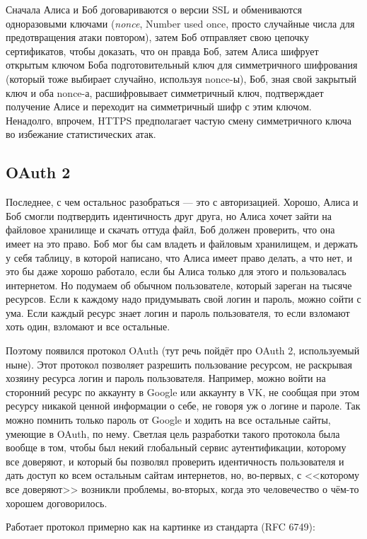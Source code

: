 \documentclass{../../text-style}
\begin{document}
Сначала Алиса и Боб договариваются о версии SSL и обмениваются одноразовыми ключами (\textit{nonce}, Number used once, просто случайные числа для предотвращения атаки повтором), затем Боб отправляет свою цепочку сертификатов, чтобы доказать, что он правда Боб, затем Алиса шифрует открытым ключом Боба подготовительный ключ для симметричного шифрования (который тоже выбирает случайно, используя nonce-ы), Боб, зная свой закрытый ключ и оба nonce-а, расшифровывает симметричный ключ, подтверждает получение Алисе и переходит на симметричный шифр с этим ключом. Ненадолго, впрочем, HTTPS предполагает частую смену симметричного ключа во избежание статистических атак.

\subsection{OAuth 2}

Последнее, с чем остальнос разобраться --- это с авторизацией. Хорошо, Алиса и Боб смогли подтвердить идентичность друг друга, но Алиса хочет зайти на файловое хранилище и скачать оттуда файл, Боб должен проверить, что она имеет на это право. Боб мог бы сам владеть и файловым хранилищем, и держать у себя таблицу, в которой написано, что Алиса имеет право делать, а что нет, и это бы даже хорошо работало, если бы Алиса только для этого и пользовалась интернетом. Но подумаем об обычном пользователе, который зареган на тысяче ресурсов. Если к каждому надо придумывать свой логин и пароль, можно сойти с ума. Если каждый ресурс знает логин и пароль пользователя, то если взломают хоть один, взломают и все остальные.

Поэтому появился протокол OAuth (тут речь пойдёт про OAuth 2, используемый ныне). Этот протокол позволяет разрешить пользование ресурсом, не раскрывая хозяину ресурса логин и пароль пользователя. Например, можно войти на сторонний ресурс по аккаунту в Google или аккаунту в VK, не сообщая при этом ресурсу никакой ценной информации о себе, не говоря уж о логине и пароле. Так можно помнить только пароль от Google и ходить на все остальные сайты, умеющие в OAuth, по нему. Светлая цель разработки такого протокола была вообще в том, чтобы был некий глобальный сервис аутентификации, которому все доверяют, и который бы позволял проверить идентичность пользователя и дать доступ ко всем остальным сайтам интернетов, но, во-первых, с <<которому все доверяют>> возникли проблемы, во-вторых, когда это человечество о чём-то хорошем договорилось.

Работает протокол примерно как на картинке из стандарта (RFC 6749):
\end{document}
